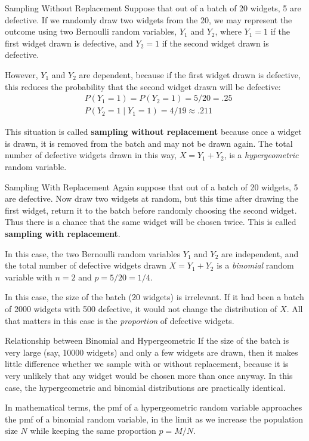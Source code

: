 \documentclass[xcolor=table]{beamer}
\renewcommand{\emph}{\textbf}
\begin{document}
\begin{frame}{Sampling Without Replacement}
Suppose that out of a batch of 20 widgets, 5 are defective. If we randomly draw two widgets from the 20, we may represent the outcome using two Bernoulli random variables, $Y_1$ and $Y_2$, where $Y_1=1$ if the first widget drawn is defective, and $Y_2=1$ if the second widget drawn is defective.

\vspace{.2cm}\pause
However, $Y_1$ and $Y_2$ are dependent, because if the first widget drawn is defective, this reduces the probability that the second widget drawn will be defective:
\begin{align*}
&P(Y_1=1)=P(Y_2=1)=5/20=.25 \\
&P(Y_2=1 \mid Y_1=1) = 4/19 \approx .211
\end{align*}

\pause This situation is called \emph{sampling without replacement} because once a widget is drawn, it is removed from the batch and may not be drawn again. 
The total number of defective widgets drawn in this way, $X=Y_1+Y_2$, is a \textit{hypergeometric} random variable.
\end{frame}

\begin{frame}{Sampling With Replacement}
Again suppose that out of a batch of 20 widgets, 5 are defective. Now draw two widgets at random, but this time after drawing the first widget, return it to the batch before randomly choosing the second widget. Thus there is a chance that the same widget will be chosen twice. This is called \emph{sampling with replacement}.

\vspace{.2cm}\pause
In this case, the two Bernoulli random variables $Y_1$ and $Y_2$ are independent, and the total number of defective widgets drawn $X=Y_1+Y_2$ is a \textit{binomial} random variable with $n=2$ and $p=5/20=1/4$.

\vspace{.2cm}\pause
In this case, the size of the batch (20 widgets) is irrelevant. If it had been a batch of 2000 widgets with 500 defective, it would not change the distribution of $X$. All that matters in this case is the \textit{proportion} of defective widgets.
\end{frame}

\begin{frame}{Relationship between Binomial and Hypergeometric}
If the size of the batch is very large (say, 10000 widgets) and only a few widgets are drawn, then it makes little difference whether we sample with or without replacement, because it is very unlikely that any widget would be chosen more than once anyway. In this case, the hypergeometric and binomial distributions are practically identical.

\vspace{.2cm}
\pause In mathematical terms, the pmf of a hypergeometric random variable approaches the pmf of a binomial random variable, in the limit as we increase the population size $N$ while keeping the same proportion $p=M/N$.
\end{frame}
\end{document}
